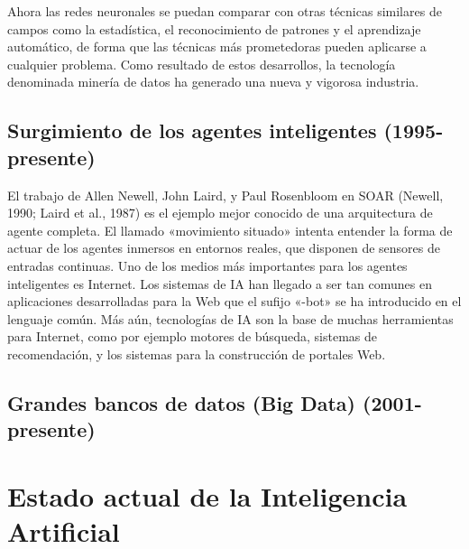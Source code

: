\documentclass{article}
\begin{document}
  Ahora las redes neuronales se puedan comparar con otras técnicas similares de campos como la estadística, el reconocimiento de patrones y el aprendizaje automático, de forma que las técnicas más prometedoras pueden aplicarse a cualquier problema. Como resultado de estos desarrollos, la tecnología denominada minería de datos ha generado una nueva y vigorosa industria.


\subsection{Surgimiento de los agentes inteligentes (1995-presente)}

 El trabajo de Allen Newell, John Laird, y Paul Rosenbloom en SOAR (Newell, 1990; Laird et al., 1987) es el ejemplo mejor conocido de una arquitectura de agente completa. El llamado «movimiento situado» intenta entender la forma de actuar de los agentes inmersos en entornos reales, que disponen de sensores de entradas continuas.
 Uno de los medios más importantes para los agentes inteligentes es Internet. Los sistemas de IA han llegado a ser tan comunes en aplicaciones desarrolladas para la Web que el sufijo «-bot» se ha introducido en el lenguaje común. Más aún, tecnologías de IA son la base de muchas herramientas para Internet, como por ejemplo motores de búsqueda, sistemas de recomendación, y los sistemas para la construcción de portales Web.

\subsection{Grandes bancos de datos (Big Data) (2001-presente)}


\section{Estado actual de la Inteligencia Artificial}
\end{document}
